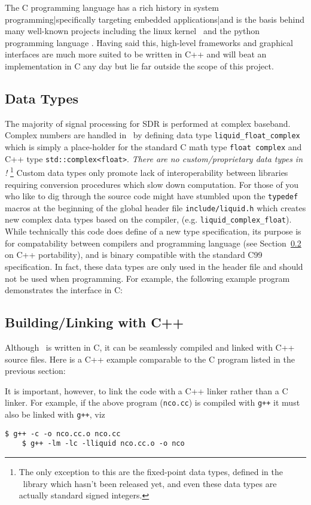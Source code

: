 The C programming language has a rich history in system
programming|specifically targeting embedded applications|and is the
basis behind many well-known projects including the linux
kernel~\cite{linux-kernel:web}
and the python programming language \cite{python:web}.
Having said this, high-level frameworks and graphical interfaces are
much more suited to be written in C++ and will beat an implementation in
C any day but lie far outside the scope of this project.

\subsection{Data Types}
\label{section:data_structures:data_types}
The majority of signal processing for SDR is performed at complex baseband.
Complex numbers are handled in \liquid\ by defining data type
{\tt liquid\_float\_complex} which is simply a place-holder for the
standard
C math type {\tt float complex} and C++ type {\tt std::complex<float>}.
{\em There are no custom/proprietary data types in \liquid!}%
\footnote{
    The only exception to this are the fixed-point data types,
    defined in the \liquidfpm\ library which hasn't been released yet,
    and even these data types are actually standard signed integers.}
Custom data types only promote lack of interoperability between
libraries requiring conversion procedures which slow down computation.
For those of you who like to dig through the source code might have
stumbled upon the {\tt typedef} macros at the beginning of the global 
header file {\tt include/liquid.h} which creates new complex data types
based on the compiler, 
(e.g. {\tt liquid\_complex\_float}).
While technically this code does define of a new type specification,
its purpose is for compatability between compilers and programming
language
(see Section~\ref{section:data_structures:c++} on C++ portability),
and is binary compatible with the standard C99 specification.
In fact, these data types are only used in the header file and should
not be used when programming.
For example, the following example program demonstrates the interface in
C:
%

%


\subsection{Building/Linking with C++}
\label{section:data_structures:c++}
Although \liquid\ is written in C, it can be seamlessly compiled and linked
with C++ source files.
Here is a C++ example comparable to the C program listed in the previous
section:
%

%
It is important, however, to link the code with a C++ linker rather than
a C linker.
For example, if the above program ({\tt nco.cc}) is compiled with
{\tt g++} it must also be linked with {\tt g++}, viz
%
\begin{Verbatim}[fontsize=\small]
    $ g++ -c -o nco.cc.o nco.cc
    $ g++ -lm -lc -lliquid nco.cc.o -o nco
\end{Verbatim}
%

